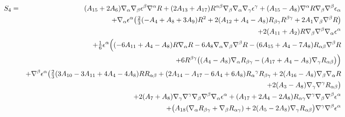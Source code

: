\documentclass[10pt,letterpaper]{article}
\numberwithin{equation}{section}
\begin{document}
\newpage
\begin{eqnarray}
S_4&=& (A_{15}{} + 2 A_{6}{}) \nabla_{\alpha }\nabla_{\beta }\epsilon^{\beta } \nabla^{\alpha }R + (2 A_{13}{} + A_{17}{}) R^{\alpha \beta } \nabla_{\beta }\nabla_{\alpha }\nabla_{\gamma }\epsilon^{\gamma } + (A_{15}{} -  A_{8}{}) \nabla^{\alpha }R \nabla_{\beta }\nabla^{\beta }\epsilon_{\alpha } \nonumber \\ 
&& + \nabla_{\alpha }\epsilon^{\alpha } \bigl(\tfrac{2}{3} (- A_{4}{} + A_{8}{} + 3 A_{9}{}) R^2 + 2 (A_{12}{} + A_{4}{} -  A_{8}{}) R_{\beta \gamma } R^{\beta \gamma } + 2 A_{1}{} \nabla_{\beta }\nabla^{\beta }R\bigr) \nonumber \\ 
&& + 2 (A_{11}{} + A_{2}{}) R \nabla_{\beta }\nabla^{\beta }\nabla_{\alpha }\epsilon^{\alpha } \nonumber \\ 
&& + \tfrac{1}{6} \epsilon^{\alpha } \Bigl((-6 A_{11}{} + A_{4}{} -  A_{8}{}) R \nabla_{\alpha }R - 6 A_{8}{} \nabla_{\alpha }\nabla_{\beta }\nabla^{\beta }R -  (6 A_{15}{} + A_{4}{} - 7 A_{8}{}) R_{\alpha \beta } \nabla^{\beta }R \nonumber\\
&& + 6 R^{\beta \gamma } \bigl((A_{4}{} -  A_{8}{}) \nabla_{\alpha }R_{\beta \gamma } -  (A_{17}{} + A_{4}{} -  A_{8}{}) \nabla_{\gamma }R_{\alpha \beta }\bigr)\Bigr) \nonumber \\ 
&& + \nabla^{\beta }\epsilon^{\alpha } \bigl(\tfrac{2}{3} (3 A_{10}{} - 3 A_{11}{} + 4 A_{4}{} - 4 A_{8}{}) R R_{\alpha \beta } + (2 A_{14}{} -  A_{17}{} - 6 A_{4}{} + 6 A_{8}{}) R_{\alpha }{}^{\gamma } R_{\beta \gamma } + 2 (A_{16}{} -  A_{8}{}) \nabla_{\beta }\nabla_{\alpha }R \nonumber\\
&&+ 2 (A_{3}{} -  A_{8}{}) \nabla_{\gamma }\nabla^{\gamma }R_{\alpha \beta }\bigr) \nonumber \\ 
&& + 2 (A_{7}{} + A_{8}{}) \nabla_{\gamma }\nabla^{\gamma }\nabla_{\beta }\nabla^{\beta }\nabla_{\alpha }\epsilon^{\alpha } + (A_{17}{} + 2 A_{4}{} - 2 A_{8}{}) R_{\alpha \gamma } \nabla^{\gamma }\nabla_{\beta }\nabla^{\beta }\epsilon^{\alpha } \nonumber \\ 
&& + \bigl(A_{18}{} (\nabla_{\alpha }R_{\beta \gamma } + \nabla_{\beta }R_{\alpha \gamma }) + 2 (A_{5}{} - 2 A_{8}{}) \nabla_{\gamma }R_{\alpha \beta }\bigr) \nabla^{\gamma }\nabla^{\beta }\epsilon^{\alpha }
\end{eqnarray}
\end{document}
